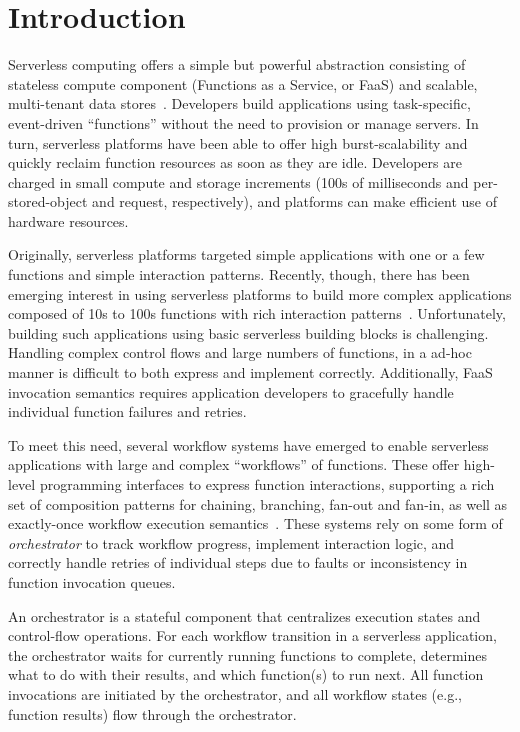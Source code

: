 \section{Introduction}

Serverless computing offers a simple but powerful abstraction consisting of
stateless compute component (Functions as a Service, or FaaS) and scalable,
multi-tenant data stores~\cite{berkeley}. Developers build applications using
task-specific, event-driven ``functions'' without the need to provision or
manage servers. In turn, serverless platforms have been able to offer high
burst-scalability and quickly reclaim function resources as soon as they are
idle. Developers are charged in small compute and storage increments (100s of
milliseconds and per-stored-object and request, respectively), and platforms
can make efficient use of hardware resources.

Originally, serverless platforms targeted simple applications with one or a few
functions and simple interaction patterns. Recently, though, there has been
emerging interest in using serverless platforms to build more complex
applications composed of 10s to 100s functions with rich interaction
patterns~\cite{excamera, pywren, gg-atc, beldi, boki}. Unfortunately, building
such applications using basic serverless building blocks is challenging.
Handling complex control flows and large numbers of functions, in a ad-hoc
manner is difficult to both express and implement correctly.  Additionally, FaaS
invocation semantics requires application developers to gracefully handle
individual function failures and retries.

To meet this need, several workflow systems have emerged to enable serverless
applications with large and complex ``workflows'' of functions. These offer
high-level programming interfaces to express function interactions, supporting a
rich set of composition patterns for chaining, branching, fan-out and fan-in, as
well as exactly-once workflow execution semantics~\cite{excamera, gg-atc,
aws-step-functions, google-cloud-composer, google-workflows, durable-functions}.
These systems rely on some form of \emph{orchestrator} to track workflow
progress, implement interaction logic, and correctly handle retries of
individual steps due to faults or inconsistency in function invocation queues.

An orchestrator is a stateful component that centralizes execution states
and control-flow operations. For each workflow transition in a serverless
application, the orchestrator waits for currently running functions to complete,
determines what to do with their results, and which function(s) to run
next. All function invocations are initiated by the orchestrator, and all
workflow states (e.g., function results) flow through the orchestrator.

